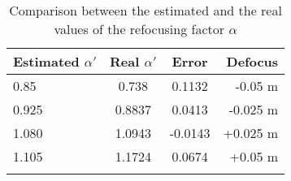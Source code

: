  \\
 \\
 \begin{table}
  \begin{tabular}{l|c|c|r}
  	\hline
  	Estimated $ \alpha'$ & Real $ \alpha'$ & Error & Defocus \\ \hline
  	0.85 & 0.738 & 0.1132 & -0.05 m\\ \hline
  	0.925 & 0.8837 & 0.0413 & -0.025 m\\ \hline 
  	1.080 & 1.0943 & -0.0143 & +0.025 m\\ \hline
  	1.105 & 1.1724 & 0.0674 & +0.05 m\\ \hline
  	\label{tab:2}
  \end{tabular}
  \caption{Comparison between the estimated and the real values of the refocusing factor $ \alpha$ }
 \end{table}

